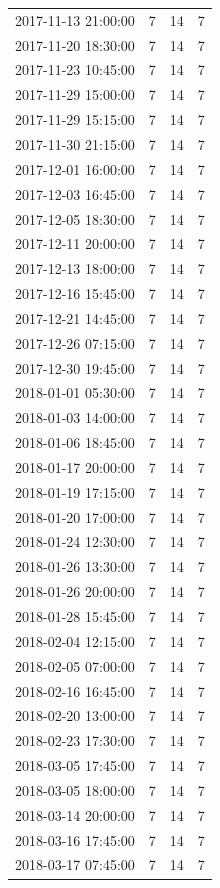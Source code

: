 \begin{tabular}{lrrr}
2017-11-13 21:00:00 & 7 & 14 & 7 \\
2017-11-20 18:30:00 & 7 & 14 & 7 \\
2017-11-23 10:45:00 & 7 & 14 & 7 \\
2017-11-29 15:00:00 & 7 & 14 & 7 \\
2017-11-29 15:15:00 & 7 & 14 & 7 \\
2017-11-30 21:15:00 & 7 & 14 & 7 \\
2017-12-01 16:00:00 & 7 & 14 & 7 \\
2017-12-03 16:45:00 & 7 & 14 & 7 \\
2017-12-05 18:30:00 & 7 & 14 & 7 \\
2017-12-11 20:00:00 & 7 & 14 & 7 \\
2017-12-13 18:00:00 & 7 & 14 & 7 \\
2017-12-16 15:45:00 & 7 & 14 & 7 \\
2017-12-21 14:45:00 & 7 & 14 & 7 \\
2017-12-26 07:15:00 & 7 & 14 & 7 \\
2017-12-30 19:45:00 & 7 & 14 & 7 \\
2018-01-01 05:30:00 & 7 & 14 & 7 \\
2018-01-03 14:00:00 & 7 & 14 & 7 \\
2018-01-06 18:45:00 & 7 & 14 & 7 \\
2018-01-17 20:00:00 & 7 & 14 & 7 \\
2018-01-19 17:15:00 & 7 & 14 & 7 \\
2018-01-20 17:00:00 & 7 & 14 & 7 \\
2018-01-24 12:30:00 & 7 & 14 & 7 \\
2018-01-26 13:30:00 & 7 & 14 & 7 \\
2018-01-26 20:00:00 & 7 & 14 & 7 \\
2018-01-28 15:45:00 & 7 & 14 & 7 \\
2018-02-04 12:15:00 & 7 & 14 & 7 \\
2018-02-05 07:00:00 & 7 & 14 & 7 \\
2018-02-16 16:45:00 & 7 & 14 & 7 \\
2018-02-20 13:00:00 & 7 & 14 & 7 \\
2018-02-23 17:30:00 & 7 & 14 & 7 \\
2018-03-05 17:45:00 & 7 & 14 & 7 \\
2018-03-05 18:00:00 & 7 & 14 & 7 \\
2018-03-14 20:00:00 & 7 & 14 & 7 \\
2018-03-16 17:45:00 & 7 & 14 & 7 \\
2018-03-17 07:45:00 & 7 & 14 & 7 \\

\end{tabular}

